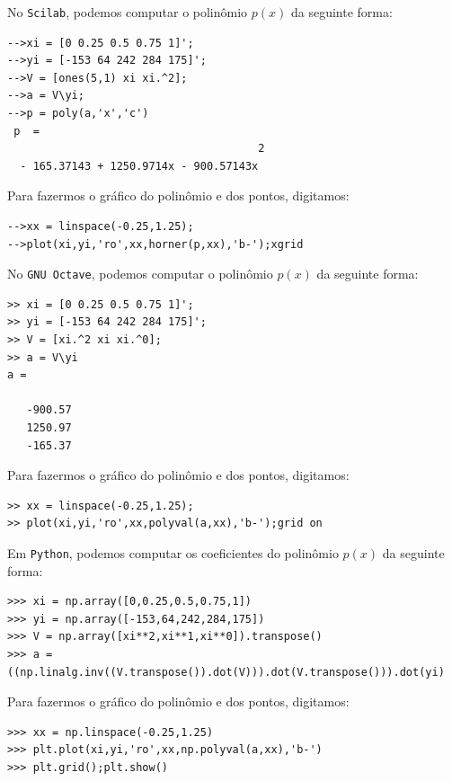 \begin{sol}
\ifisscilab
No \verb+Scilab+, podemos computar o polinômio $p(x)$ da seguinte forma:
\begin{verbatim}
-->xi = [0 0.25 0.5 0.75 1]';
-->yi = [-153 64 242 284 175]';
-->V = [ones(5,1) xi xi.^2];
-->a = V\yi;
-->p = poly(a,'x','c')
 p  =
                                       2
  - 165.37143 + 1250.9714x - 900.57143x
\end{verbatim}
Para fazermos o gráfico do polinômio e dos pontos, digitamos:
\begin{verbatim}
-->xx = linspace(-0.25,1.25);
-->plot(xi,yi,'ro',xx,horner(p,xx),'b-');xgrid
\end{verbatim}
\fi
\ifisoctave
No \verb+GNU Octave+, podemos computar o polinômio $p(x)$ da seguinte forma:
\begin{verbatim}
>> xi = [0 0.25 0.5 0.75 1]';
>> yi = [-153 64 242 284 175]';
>> V = [xi.^2 xi xi.^0];
>> a = V\yi
a =

   -900.57
   1250.97
   -165.37
\end{verbatim}
Para fazermos o gráfico do polinômio e dos pontos, digitamos:
\begin{verbatim}
>> xx = linspace(-0.25,1.25);
>> plot(xi,yi,'ro',xx,polyval(a,xx),'b-');grid on
\end{verbatim}
\fi
\ifispython
Em \verb+Python+, podemos computar os coeficientes do polinômio $p(x)$ da seguinte forma:
\begin{verbatim}
>>> xi = np.array([0,0.25,0.5,0.75,1])
>>> yi = np.array([-153,64,242,284,175])
>>> V = np.array([xi**2,xi**1,xi**0]).transpose()
>>> a = ((np.linalg.inv((V.transpose()).dot(V))).dot(V.transpose())).dot(yi)
\end{verbatim}
Para fazermos o gráfico do polinômio e dos pontos, digitamos:
\begin{verbatim}
>>> xx = np.linspace(-0.25,1.25)
>>> plt.plot(xi,yi,'ro',xx,np.polyval(a,xx),'b-')
>>> plt.grid();plt.show()
\end{verbatim}
\fi
\end{sol}

